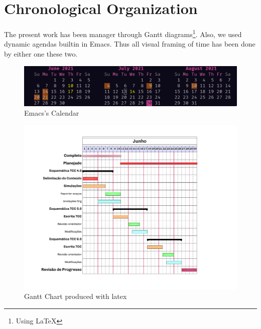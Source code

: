 \documentclass[
12pt,				%
openright,			%
oneside,			%
a4paper,			%
brazil,				%
english,			  %
]{abntex2}
\begin{document}




\section{Chronological Organization}

The present work has been manager through Gantt
diagrams\footnote{Using \LaTeX}. Also, we used dynamic agendas builtin
in Emacs. Thus all visual framing of time has been done by either one
these two.

\begin{figure}[ht]
  \centering
  \caption{\label{fig:calendar} Emacs's Calendar}
  \includegraphics[width=0.7\linewidth]{Imagens/calendar.png}
\end{figure}

\begin{figure}[ht]
  \centering
  \caption{\label{fig:gantt} Gantt Chart produced with latex}
  \includegraphics[width=0.7\linewidth]{Schedule/cronograma-tcc.pdf}
\end{figure}
\end{document}
